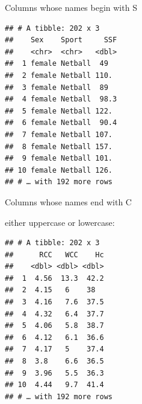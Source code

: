 \documentclass[ignorenonframetext,]{beamer}
\newenvironment{Shaded}{\begin{snugshade}}{\end{snugshade}}
\newcommand{\KeywordTok}[1]{\textcolor[rgb]{0.13,0.29,0.53}{\textbf{#1}}}
\newcommand{\NormalTok}[1]{#1}
\newcommand{\OperatorTok}[1]{\textcolor[rgb]{0.81,0.36,0.00}{\textbf{#1}}}
\newcommand{\StringTok}[1]{\textcolor[rgb]{0.31,0.60,0.02}{#1}}
\begin{document}
\begin{frame}[fragile]{Columns whose names begin with S}
\protect\hypertarget{columns-whose-names-begin-with-s}{}

\begin{Shaded}
\end{Shaded}

\begin{verbatim}
## # A tibble: 202 x 3
##    Sex    Sport     SSF
##    <chr>  <chr>   <dbl>
##  1 female Netball  49  
##  2 female Netball 110. 
##  3 female Netball  89  
##  4 female Netball  98.3
##  5 female Netball 122. 
##  6 female Netball  90.4
##  7 female Netball 107. 
##  8 female Netball 157. 
##  9 female Netball 101. 
## 10 female Netball 126. 
## # … with 192 more rows
\end{verbatim}

\end{frame}

\begin{frame}[fragile]{Columns whose names end with C}
\protect\hypertarget{columns-whose-names-end-with-c}{}

either uppercase or lowercase:

\begin{Shaded}
\end{Shaded}

\begin{verbatim}
## # A tibble: 202 x 3
##      RCC   WCC    Hc
##    <dbl> <dbl> <dbl>
##  1  4.56  13.3  42.2
##  2  4.15   6    38  
##  3  4.16   7.6  37.5
##  4  4.32   6.4  37.7
##  5  4.06   5.8  38.7
##  6  4.12   6.1  36.6
##  7  4.17   5    37.4
##  8  3.8    6.6  36.5
##  9  3.96   5.5  36.3
## 10  4.44   9.7  41.4
## # … with 192 more rows
\end{verbatim}

\end{frame}
\end{document}

